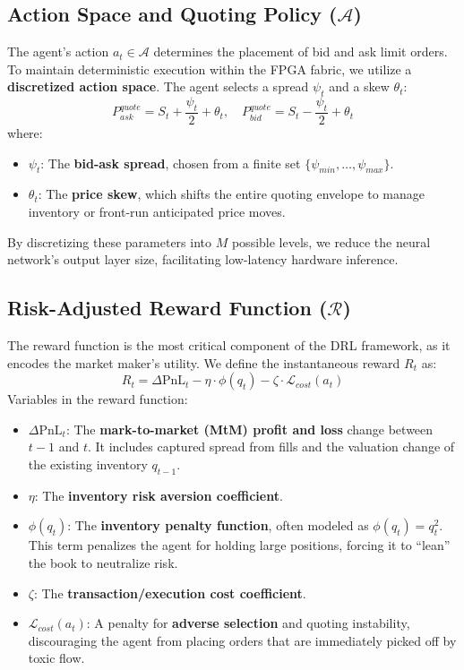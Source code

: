 \subsection{Action Space and Quoting Policy ($\mathcal{A}$)}
The agent's action $a_t \in \mathcal{A}$ determines the placement of bid and ask limit orders. To maintain deterministic execution within the FPGA fabric, we utilize a \textbf{discretized action space}. The agent selects a spread $\psi_t$ and a skew $\theta_t$:
\begin{equation}
    P_{ask}^{quote} = S_t + \frac{\psi_t}{2} + \theta_t, \quad P_{bid}^{quote} = S_t - \frac{\psi_t}{2} + \theta_t
\end{equation}
where:
\begin{itemize}
    \item $\psi_t$: The \textbf{bid-ask spread}, chosen from a finite set $\{ \psi_{min}, \dots, \psi_{max} \}$.
    \item $\theta_t$: The \textbf{price skew}, which shifts the entire quoting envelope to manage inventory or front-run anticipated price moves.
\end{itemize}
By discretizing these parameters into $M$ possible levels, we reduce the neural network's output layer size, facilitating low-latency hardware inference.

\subsection{Risk-Adjusted Reward Function ($\mathcal{R}$)}
The reward function is the most critical component of the DRL framework, as it encodes the market maker's utility. We define the instantaneous reward $R_t$ as:
\begin{equation}
    R_t = \Delta \text{PnL}_t - \eta \cdot \phi(q_t) - \zeta \cdot \mathcal{L}_{cost}(a_t)
\end{equation}
Variables in the reward function:
\begin{itemize}
    \item $\Delta \text{PnL}_t$: The \textbf{mark-to-market (MtM) profit and loss} change between $t-1$ and $t$. It includes captured spread from fills and the valuation change of the existing inventory $q_{t-1}$.
    \item $\eta$: The \textbf{inventory risk aversion coefficient}.
    \item $\phi(q_t)$: The \textbf{inventory penalty function}, often modeled as $\phi(q_t) = q_t^2$. This term penalizes the agent for holding large positions, forcing it to ``lean'' the book to neutralize risk.
    \item $\zeta$: The \textbf{transaction/execution cost coefficient}.
    \item $\mathcal{L}_{cost}(a_t)$: A penalty for \textbf{adverse selection} and quoting instability, discouraging the agent from placing orders that are immediately picked off by toxic flow.
\end{itemize}

